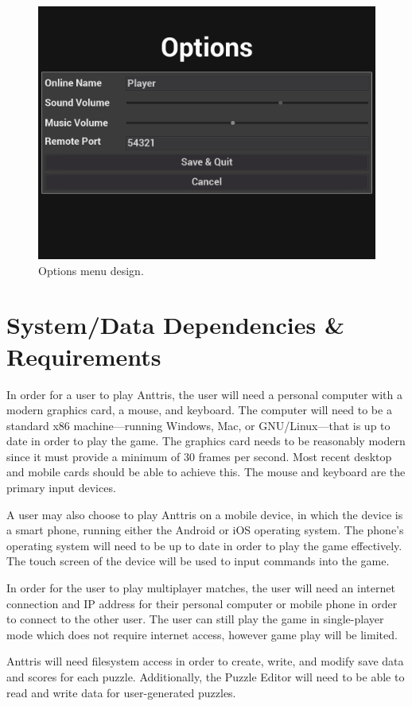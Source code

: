\documentclass[12pt]{article}
\begin{document}
    \begin{figure}[H]
        \centering
        \includegraphics[width=4.5in]{Anttris_OptionsMenu.png}
        \caption{Options menu design.}
    \end{figure}
\section{System/Data Dependencies \& Requirements}
In order for a user to play Anttris, the user will need a personal computer with a modern graphics card, a mouse, and keyboard. The computer will need to be a standard x86 machine---running Windows, Mac, or GNU/Linux---that is up to date in order to play the game.
The graphics card needs to be reasonably modern since it must provide a minimum of 30 frames per second. Most recent desktop and mobile cards should be able to achieve this. The mouse and keyboard are the primary input devices.

A user may also choose to play Anttris on a mobile device, in which the device is a smart phone, running either the Android or iOS operating system. The phone's operating system will need to be up to date in order to play the game effectively. The touch screen of the device will be used to input commands into the game.

In order for the user to play multiplayer matches, the user will need an internet connection and IP address for their personal computer or mobile phone in order to connect to the other user. The user can still play the game in single-player mode which does not require internet access, however game play will be limited.

Anttris will need filesystem access in order to create, write, and modify save data and scores for each puzzle. Additionally, the Puzzle Editor will need to be able to read and write data for user-generated puzzles.
\end{document}
